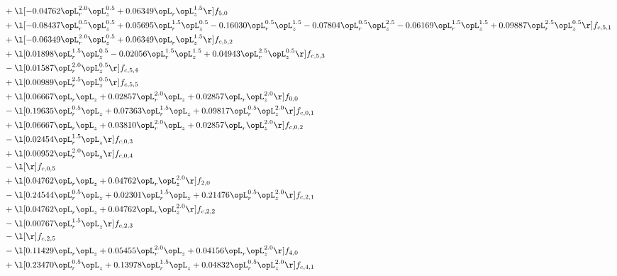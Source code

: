 \begin{alignat}{2}
& + \l[  -0.04762 \opL_r^{2.0} \opL_z^{0.5} +  0.06349 \opL_r \opL_z^{1.5}  \r] f_{5,0} \nonumber \\ 
& + \l[  -0.08437 \opL_r^{0.5} \opL_z^{0.5} +  0.05695 \opL_r^{1.5} \opL_z^{0.5}   -0.16030 \opL_r^{0.5} \opL_z^{1.5}   -0.07804 \opL_r^{0.5} \opL_z^{2.5}   -0.06169 \opL_r^{1.5} \opL_z^{1.5} +  0.09887 \opL_r^{2.5} \opL_z^{0.5}  \r] f_{c,5,1} \nonumber \\ 
& + \l[  -0.06349 \opL_r^{2.0} \opL_z^{0.5} +  0.06349 \opL_r \opL_z^{1.5}  \r] f_{c,5,2} \nonumber \\ 
& + \l[  0.01898 \opL_r^{1.5} \opL_z^{0.5}   -0.02056 \opL_r^{1.5} \opL_z^{1.5} +  0.04943 \opL_r^{2.5} \opL_z^{0.5}  \r] f_{c,5,3} \nonumber \\ 
& - \l[  0.01587 \opL_r^{2.0} \opL_z^{0.5}  \r] f_{c,5,4} \nonumber \\ 
& + \l[  0.00989 \opL_r^{2.5} \opL_z^{0.5}  \r] f_{c,5,5} \nonumber \\ 
& + \l[  0.06667 \opL_r \opL_z +  0.02857 \opL_r^{2.0} \opL_z +  0.02857 \opL_r \opL_z^{2.0}  \r] f_{0,0} \nonumber \\ 
& - \l[  0.19635 \opL_r^{0.5} \opL_z +  0.07363 \opL_r^{1.5} \opL_z +  0.09817 \opL_r^{0.5} \opL_z^{2.0}  \r] f_{c,0,1} \nonumber \\ 
& + \l[  0.06667 \opL_r \opL_z +  0.03810 \opL_r^{2.0} \opL_z +  0.02857 \opL_r \opL_z^{2.0}  \r] f_{c,0,2} \nonumber \\ 
& - \l[  0.02454 \opL_r^{1.5} \opL_z  \r] f_{c,0,3} \nonumber \\ 
& + \l[  0.00952 \opL_r^{2.0} \opL_z  \r] f_{c,0,4} \nonumber \\ 
& - \l[  \r] f_{c,0,5} \nonumber \\ 
& + \l[  0.04762 \opL_r \opL_z +  0.04762 \opL_r \opL_z^{2.0}  \r] f_{2,0} \nonumber \\ 
& - \l[  0.24544 \opL_r^{0.5} \opL_z +  0.02301 \opL_r^{1.5} \opL_z +  0.21476 \opL_r^{0.5} \opL_z^{2.0}  \r] f_{c,2,1} \nonumber \\ 
& + \l[  0.04762 \opL_r \opL_z +  0.04762 \opL_r \opL_z^{2.0}  \r] f_{c,2,2} \nonumber \\ 
& - \l[  0.00767 \opL_r^{1.5} \opL_z  \r] f_{c,2,3} \nonumber \\ 
& - \l[  \r] f_{c,2,5} \nonumber \\ 
& - \l[  0.11429 \opL_r \opL_z +  0.05455 \opL_r^{2.0} \opL_z +  0.04156 \opL_r \opL_z^{2.0}  \r] f_{4,0} \nonumber \\ 
& + \l[  0.23470 \opL_r^{0.5} \opL_z +  0.13978 \opL_r^{1.5} \opL_z +  0.04832 \opL_r^{0.5} \opL_z^{2.0}  \r] f_{c,4,1} \nonumber \\ 

\end{alignat}
